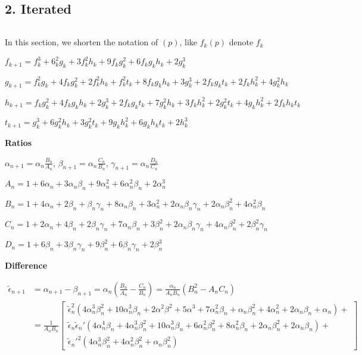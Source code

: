 \subsection*{2. Iterated}$ $

In this section, we shorten the notation of $(p)$, like $f_k(p)$ denote $f_k$

$f_{k+1} = f_k^3 + 6_k^2g_k + 3f_k^2h_k + 9f_kg_k^2 + 6f_kg_kh_k + 2g_k^3$

$g_{k+1} = f_k^2g_k + 4f_kg_k^2 + 2f_k^2h_k + f_k^2t_k + 8f_kg_kh_k + 3g_k^3 + 2f_kg_kt_k + 2f_kh_k^2 + 4g_k^2h_k$

$h_{k+1} = f_kg_k^2 + 4f_kg_kh_k + 2g_k^3 + 2f_kg_kt_k + 7g_k^2h_k + 3f_kh_k^2 + 2g_k^2t_k + 4g_kh_k^2 + 2f_kh_kt_k$

$t_{k+1} = g_k^3 + 6g_k^2h_k + 3g_k^2t_k + 9g_kh_k^2 + 6g_kh_kt_k + 2h_k^3$

\textbf{Ratios}

$\alpha_{n+1} = \alpha_n\frac{B_n}{A_n}$, $\beta_{n+1} = \alpha_n\frac{C_n}{B_n}$, $\gamma_{n+1} = \alpha_n\frac{D_n}{C_n}$

$A_n = 1 + 6\alpha_n + 3\alpha_n\beta_n + 9\alpha_n^2 + 6\alpha_n^2\beta_n + 2\alpha_n^3$

$B_n = 1 + 4\alpha_n + 2\beta_n + \beta_n\gamma_n + 8\alpha_n\beta_n + 3\alpha_n^2 + 2\alpha_n\beta_n\gamma_n + 2\alpha_n\beta_n^2 + 4\alpha_n^2\beta_n$

$C_n = 1 + 2\alpha_n + 4\beta_n + 2\beta_n\gamma_n + 7\alpha_n\beta_n + 3\beta_n^2 + 2\alpha_n\beta_n\gamma_n + 4\alpha_n\beta_n^2 + 2\beta_n^2\gamma_n$


$D_n = 1 + 6\beta_n + 3\beta_n\gamma_n + 9\beta_n^2 + 6\beta_n\gamma_n + 2\beta_n^3$

\newpage

\textbf{Difference}

\begin{align*}
\tilde{\epsilon}_{n+1} &= \alpha_{n+1} - \beta_{n+1} = \alpha_n\left( \frac{B_n}{A_n} - \frac{C_n}{B_n} \right) = \frac{\alpha_n}{A_nB_n}\left( B_n^2 - A_nC_n \right)\\
&= \frac{1}{A_nB_n}\left[ 
\begin{array}{l}
\tilde{\epsilon}_n^2
(4\alpha_n^3\beta_n^2 + 10\alpha_n^3\beta_n + 2\alpha^2\beta^2 + 5\alpha^3
+ 7\alpha_n^2\beta_n + \alpha_n\beta_n^2 + 4\alpha_n^2 + 2\alpha_n\beta_n + \alpha_n)+\\
\tilde{\epsilon}_n\tilde{\epsilon}_n'
(4\alpha_n^4\beta_n + 4\alpha_n^3\beta_n^2 + 10\alpha_n^3\beta_n + 6\alpha_n^2\beta_n^2+
8\alpha_n^2\beta_n + 2\alpha_n\beta_n^2 + 2\alpha_n\beta_n)+\\
\tilde{\epsilon}_n'^2
(4\alpha_n^3\beta_n^2 + 4\alpha_n^2\beta_n^2 + \alpha_n\beta_n^2)
\end{array}\right]
\end{align*}

